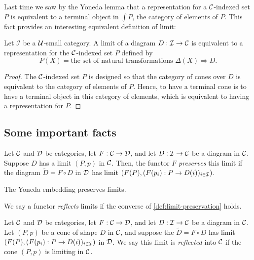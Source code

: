 Last time we saw by the Yoneda lemma that a representation for a \(\mathcal C\)-indexed set \(P\)
is equivalent to a terminal object in \(\int P\), the category of elements of \(P\).
This fact provides an interesting equivalent definition of limit:
\begin{proposition}
  Let \(\mathcal I\) be a \(\mathcal U\)-small category.
  A limit of a diagram \(D : \mathcal I \to \mathcal C\)
  is equivalent to a representation for the \(\mathcal C\)-indexed set \(P\) defined by
  \[
     P(X) = \text{the set of natural transformations }\Delta(X) \Rightarrow D.
  \]
\end{proposition}
\begin{proof}
  The \(\mathcal C\)-indexed set \(P\) is designed so that
  the category of cones over \(D\) is equivalent to the category of elements of \(P\).
  Hence, to have a terminal cone is to have a terminal object in this category of elements,
which is equivalent to having a representation for \(P\).
\end{proof}


\subsection{Some important facts}

\begin{definition} \label{def:limit-preservation}
  \sloppy
  Let $\mathcal C$ and $\mathcal D$ be categories, let $F : \mathcal C \to \mathcal D$,
  and let $D : \mathcal I \to \mathcal C$ 
  be a diagram in $\mathcal C$. 
  Suppose $D$ has a limit $(P,p)$ in $\mathcal C$. Then,
  the functor $F$ \emph{preserves} this limit
  if
  the diagram $\tilde{D} = F \circ D$ in $\mathcal D$
  has limit
  $(F(P), (F(p_i) : P \to D(i))_{i\in \mathcal I})$.
\end{definition}

\begin{proposition}
  The Yoneda embedding preserves limits.
\end{proposition}

We say a functor \emph{reflects} limits if the converse of \cref{def:limit-preservation} holds.

\begin{definition}
  \sloppy
  Let $\mathcal C$ and $\mathcal D$ be categories, let $F : \mathcal C \to \mathcal D$,
  and let $D : \mathcal I \to \mathcal C$
  be a diagram in $\mathcal C$.
  Let \((P,p)\) be a cone of shape \(D\) in \(\mathcal C\),
  and suppose the $\tilde{D} = F \circ D$
  has limit $(F(P), (F(p_i) : P \to D(i))_{i\in \mathcal I})$ in \(\mathcal D\).
  We say this limit is \emph{reflected} into \(\mathcal C\)
  if the cone $(P,p)$ is limiting in $\mathcal C$.
\end{definition}

